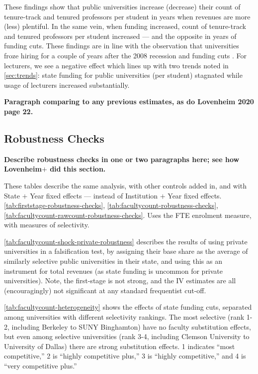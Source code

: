 These findings show that public universities increase (decrease) their count of tenure-track and tenured professors per student in years when revenues are more (less) plentiful.
In the same vein, when funding increased, count of tenure-track and tenured professors per student increased --- and the opposite in years of funding cuts.
These findings are in line with the observation that universities froze hiring for a couple of years after the 2008 recession and funding cuts \citep{turner2014impact}.
For lecturers, we see a negative effect which lines up with two trends noted in \autoref{sec:trends}: state funding for public universities (per student) stagnated while usage of lecturers increased substantially.


\textbf{Paragraph comparing to any previous estimates, as do Lovenheim 2020 page 22.}

\subsection{Robustness Checks}
\label{sec:results-robustness}
\textbf{Describe robustness checks in one or two paragraphs here; see how Lovenheim$+$ did this section.}

These tables describe the same analysis, with other controls added in, and with State $+$ Year fixed effects --- instead of Institution $+$ Year fixed effects.
\autoref{tab:firststage-robustness-checks},
\autoref{tab:facultycount-robustness-checks},
\autoref{tab:facultycount-rawcount-robustness-checks}.
Uses the FTE enrolment measure, with measures of selectivity.

\autoref{tab:facultycount-shock-private-robustness} describes the results of using private universities in a falsification test, by assigning their base share as the average of similarly selective public universities in their state, and using this as an instrument for total revenues (as state funding is uncommon for private universities).
Note, the first-stage is not strong, and the IV estimates are all (encouragingly) not significant at any standard frequentist cut-off.

\autoref{tab:facultycount-heterogeneity} shows  the effects of state funding cuts, separated among universities with different selectivity rankings.
The most selective (rank 1-2, including Berkeley to SUNY Binghamton) have no faculty substitution effects, but even among selective universities (rank 3-4, including Clemson University to University of Dallas) there are strong substitution effects.
1 indicates “most competitive,” 2 is “highly competitive plus,” 3 is “highly competitive,” and 4 is “very competitive plus.”

